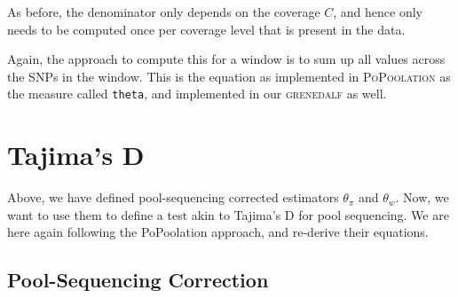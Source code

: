 \documentclass[a4paper,9pt,DIV=14]{scrartcl}
\newcounter{todo}
\newcommand\todo[1]{}
\newcommand\toolname{\textsc}
\begin{document}
%
As before, the denominator only depends on the coverage $C$,
and hence only needs to be computed once per coverage level that is present in the data.

Again, the approach to compute this for a window is to sum up all values across the SNPs in the window.
This is the equation as implemented in \toolname{PoPoolation} as the measure called \texttt{theta},
and implemented in our \toolname{grenedalf} as well.

\todo{Jeff, is this all sound now? Is this the correct estimator for what we want it to do?}
\todo{(Moi) I think Jeff wenth through this already}






\section{Tajima's D}
\label{supp:sec:TajimaD}

Above, we have defined pool-sequencing corrected estimators $\theta_\pi$ and $\theta_w$.
Now, we want to use them to define a test akin to Tajima's D for pool sequencing.
We are here again following the PoPoolation approach, and re-derive their equations.


\subsection{Pool-Sequencing Correction}
\label{supp:sec:TajimaD:sub:PoolSequencingCorrection}
\end{document}
